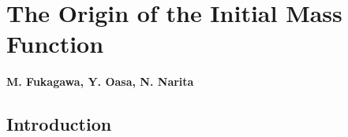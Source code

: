 
\def\thisdir{science/starplanet/}

%




%

\section{The Origin of the Initial Mass Function\label{sec:IMF}}

\begin{center}
\noindent
{\bf M. Fukagawa, Y. Oasa, N. Narita}
\end{center}
\vspace{0.5cm}

\normalsize
\subsection{Introduction}

